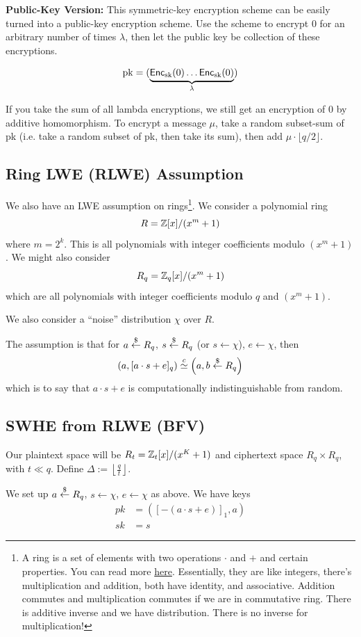 \textbf{Public-Key Version:} This symmetric-key encryption scheme can be easily turned into a public-key encryption scheme. Use the scheme to encrypt 0 for an arbitrary number of times $\lambda$, then let the public key be collection of these encryptions.

$$\mathrm{pk} = (\underbrace{\operatorname{\mathsf{Enc}}_{\mathrm{sk}}(0) \dots \operatorname{\mathsf{Enc}}_{\mathrm{sk}}(0)}_{\lambda})$$

If you take the sum of all lambda encryptions, we still get an encryption of 0 by additive homomorphism. To encrypt a message $\mu$, take a random subset-sum of pk (i.e. take a random subset of pk, then take its sum), then add $\mu \cdot \lfloor q/ 2 \rfloor $.


\subsection{Ring LWE (RLWE) Assumption}
We also have an LWE assumption on rings\footnote{A ring is a set of elements with two operations $\cdot$ and $+$ and certain properties. You can read more \href{https://en.wikipedia.org/wiki/Ring_(mathematics)}{here}. Essentially, they are like integers, there's multiplication and addition, both have identity, and associative. Addition commutes and multiplication commutes if we are in commutative ring. There is additive inverse and we have distribution. There is no inverse for multiplication!}. We consider a polynomial ring
\[R = \mathbb Z[x]/(x^m + 1)\]
where $m = 2^k$. This is all polynomials with integer coefficients modulo $(x^m + 1)$. We might also consider
\[R_q = \mathbb Z_q[x] / (x^m + 1)\]
which are all polynomials with integer coefficients modulo $q$ and $(x^m + 1)$.

We also consider a ``noise'' distribution $\chi$ over $R$.

The assumption is that for $a\overset{\$}{\leftarrow} R_q$, $s\overset{\$}{\leftarrow} R_q$ (or $s\leftarrow \chi$), $e\leftarrow \chi$, then
\[\left( a, [a\cdot s + e]_q \right) \overset{c}{\simeq} \left( a, b\overset{\$}{\leftarrow} R_q \right)\]
which is to say that $a\cdot s + e$ is computationally indistinguishable from random.


\subsection{SWHE from RLWE (BFV)}
Our plaintext space will be $R_t = \mathbb Z_t[x]/(x^K + 1)$ and ciphertext space $R_q\times R_q$, with $t\ll q$. Define $\Delta := \left\lfloor \frac{q}{t}\right\rfloor$.

We set up $a\overset{\$}{\leftarrow} R_q$, $s\leftarrow \chi$, $e\leftarrow \chi$ as above. We have keys
\begin{align*}
    pk & = \left( [-(a\cdot s + e)]_1, a \right) \\
    sk & = s
\end{align*}

